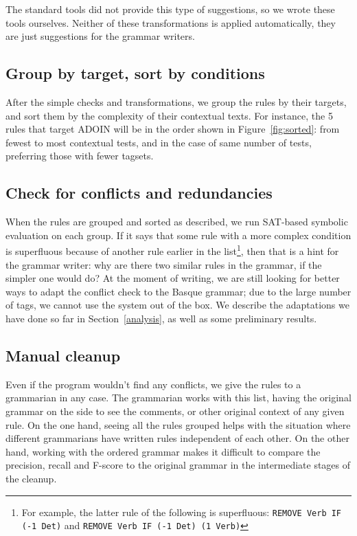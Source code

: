 \documentclass[11pt]{article}
\begin{document}
The standard tools did not provide this type of suggestions, so we wrote these tools ourselves. Neither of these transformations is applied automatically, they are just suggestions for the grammar writers.



\subsection{Group by target, sort by conditions}
After the simple checks and transformations, we group the rules by their targets, and sort them by the complexity of their contextual texts. For instance, the 5 rules that target ADOIN will be in the order shown in Figure~\ref{fig:sorted}: from fewest to most contextual tests, and in the case of same number of tests, preferring those with fewer tagsets.


\subsection{Check for conflicts and redundancies}

When the rules are grouped and sorted as described, we run SAT-based 
symbolic evaluation \cite{listenmaa_claessen2016} on each group. 
If it says that some rule with a more complex condition is superfluous 
because of another rule earlier in the list\footnote{For example, the latter rule of the following is superfluous: \texttt{REMOVE Verb IF (-1 Det)} and \texttt{REMOVE Verb IF (-1 Det) (1 Verb)}}, 
then that is a hint for the grammar writer: why are there two similar 
rules in the grammar, if the simpler one would do?
At the moment of writing, we are still looking for better ways to adapt the conflict check
to the Basque grammar; due to the large number of tags, we cannot use the system out of the box.
We describe the adaptations we have done so far in Section~\ref{analysis},
as well as some preliminary results.

\subsection{Manual cleanup}
\label{manual} 

Even if the program wouldn't find any conflicts, we give the rules to 
a grammarian in any case. The grammarian works with this list, having 
the original grammar on the side to see the comments, or other original 
context of any given rule. 
On the one hand, seeing all the rules grouped helps with the 
situation where different grammarians have written rules independent of 
each other. On the other hand, working with the ordered grammar makes
it difficult to compare the precision, recall and F-score to the
original grammar in the intermediate stages of the cleanup. 
\end{document}
